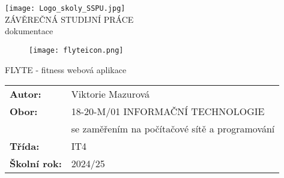 \documentclass[12pt, a4paper,
twoside,        %
openany
]{report}
\title{\Flyte} %
\author{\Viktorie Mazurová} %
\date{\14.1.2025} %
\newcommand\obor{INFORMAČNÍ TECHNOLOGIE} %
\newcommand\kodOboru{18-20-M/01} %
\newcommand\zamereni{se zaměřením na počítačové sítě a programování} %
\newcommand\trida{IT4} %
\newcommand\jmenoAutora{Viktorie Mazurová}  %
\newcommand\skolniRok{2024/25} %
\newcommand\nazevPrace{FLYTE - fitness webová aplikace} %
\begin{document}
	
	\pagestyle{empty}
	
	\cleardoublepage

	
	{\selectfont
		
        {\bfseries %
			\begin{center}
            \texttt{[image: Logo\_skoly\_SSPU.jpg]} %
            \\
			
				\LARGE{ZÁVĚREČNÁ STUDIJNÍ PRÁCE}\\
				\large{dokumentace}\\
				
				
			\end{center}  
		\begin{figure}[h]
			\centering
			\texttt{[image: flyteicon.png]} 
		\end{figure}
        \begin{center}
        \LARGE {\nazevPrace}\\
			\end{center}  
		
		
		
		}%
		
		
		
		\vspace{0.02 \textheight}
		\begin{table}[h!]
			\begin{tabular}{ll}
				\textbf{Autor:} & \jmenoAutora\\ 
				\textbf{Obor:} & \kodOboru { } \obor\\
				\textbf{} & \zamereni\\
				\textbf{Třída:} & \trida\\
				\textbf{Školní rok:} & \skolniRok\\
			\end{tabular}
			
		\end{table}		
	}
	 \vspace{18pt}
        \clearpage 

	

	
\end{document}
